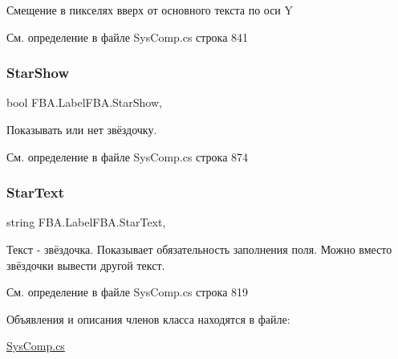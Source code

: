 Смещение в пикселях вверх от основного текста по оси Y 



См. определение в файле Sys\+Comp.\+cs строка 841

\mbox{\label{class_f_b_a_1_1_label_f_b_a_a2bd5c9da08548f80ebe5d788b2a27248}} 
\subsubsection{\texorpdfstring{Star\+Show}{StarShow}}
{\footnotesize\ttfamily bool F\+B\+A.\+Label\+F\+B\+A.\+Star\+Show\hspace{0.3cm}{\ttfamily [get]}, {\ttfamily [set]}}



Показывать или нет звёздочку. 



См. определение в файле Sys\+Comp.\+cs строка 874

\mbox{\label{class_f_b_a_1_1_label_f_b_a_a52cda6f76512f2cacf128cc4383dc787}} 
\subsubsection{\texorpdfstring{Star\+Text}{StarText}}
{\footnotesize\ttfamily string F\+B\+A.\+Label\+F\+B\+A.\+Star\+Text\hspace{0.3cm}{\ttfamily [get]}, {\ttfamily [set]}}



Текст -\/ звёздочка. Показывает обязательность заполнения поля. Можно вместо звёздочки вывести другой текст. 



См. определение в файле Sys\+Comp.\+cs строка 819



Объявления и описания членов класса находятся в файле\+:\begin{DoxyCompactItemize}
\item 
\mbox{\hyperlink{_sys_comp_8cs}{Sys\+Comp.\+cs}}\end{DoxyCompactItemize}
